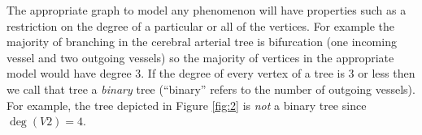 \documentclass[10pt]{amsart} %
\theoremstyle{definition}
\newtheorem{ex}[thm]{Example}
\begin{document}
The appropriate graph to model any phenomenon will have properties such as a restriction on the degree of a particular or all 
of the vertices.  For example the majority of branching in the cerebral arterial tree is bifurcation (one incoming vessel and two
outgoing vessels)
\cite{Cassot} so the majority 
 of vertices in the appropriate model would have degree 3.   If the degree of every vertex of a tree is 3 or less then we call
 that tree a \emph{binary} tree  (``binary'' refers to the number of outgoing vessels).  For example,
the tree depicted in Figure \ref{fig:2} is \emph{not} a binary tree since $\deg(V2) = 4$.

\end{document}
